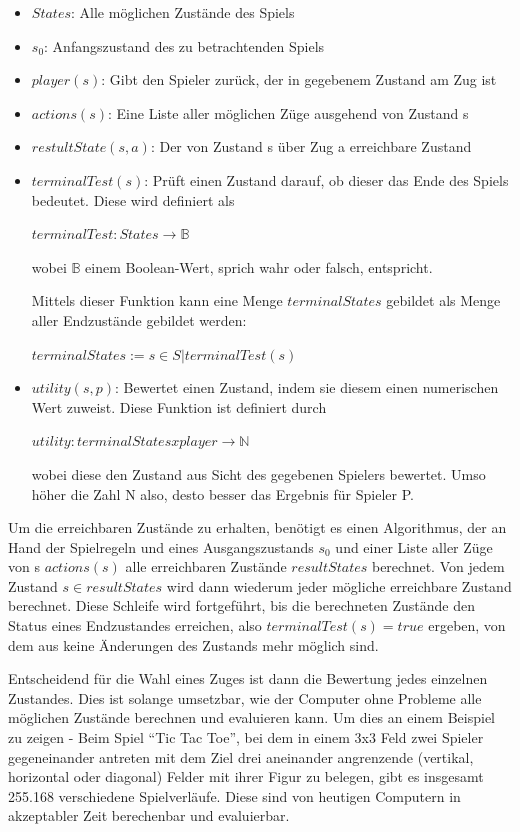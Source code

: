 \begin{itemize}
\item \textbf{$States$}: Alle möglichen Zustände des Spiels
\item \textbf{$s_0$}: Anfangszustand des zu betrachtenden Spiels
\item \textbf{$player(s)$}: Gibt den Spieler zurück, der in gegebenem Zustand am Zug ist
\item \textbf{$actions(s)$}: Eine Liste aller möglichen Züge ausgehend von Zustand s
\item \textbf{$restultState(s,a)$}: Der von Zustand s über Zug a erreichbare Zustand
\item \textbf{$terminalTest(s)$}:  Prüft einen Zustand darauf, ob dieser das Ende des Spiels bedeutet. Diese wird definiert als

$terminalTest : States \rightarrow \mathbb{B}$

wobei $\mathbb{B}$ einem Boolean-Wert, sprich wahr oder falsch, entspricht.

Mittels dieser Funktion kann eine Menge $terminalStates$ gebildet als Menge aller Endzustände gebildet werden:

$terminalStates := {s \in S | terminalTest(s)}$
\item \textbf{$utility(s, p)$}: Bewertet einen Zustand, indem sie diesem einen numerischen Wert zuweist. Diese Funktion ist definiert durch

$utility : terminalStates x player \rightarrow \mathbb{N}$

wobei diese den Zustand aus Sicht des gegebenen Spielers bewertet. Umso höher die Zahl N also, desto besser das Ergebnis für Spieler P.
\end{itemize}

Um die erreichbaren Zustände zu erhalten, benötigt es einen Algorithmus, der an Hand der Spielregeln und eines Ausgangszustands $s_0$ und einer Liste aller Züge von s $actions(s)$ alle erreichbaren Zustände $resultStates$ berechnet. Von jedem Zustand $s \in resultStates$ wird dann wiederum jeder mögliche erreichbare Zustand berechnet. Diese Schleife wird fortgeführt, bis die berechneten Zustände den Status eines Endzustandes erreichen, also $terminalTest(s) = true$ ergeben, von dem aus keine Änderungen des Zustands mehr möglich sind.

Entscheidend für die Wahl eines Zuges ist dann die Bewertung jedes einzelnen Zustandes. Dies ist solange umsetzbar, wie der Computer ohne Probleme alle möglichen Zustände berechnen und evaluieren kann. Um dies an einem Beispiel zu zeigen - Beim Spiel ``Tic Tac Toe'', bei dem in einem 3x3 Feld zwei Spieler gegeneinander antreten mit dem Ziel drei aneinander angrenzende (vertikal, horizontal oder diagonal) Felder mit ihrer Figur zu belegen, gibt es insgesamt 255.168 verschiedene Spielverläufe. Diese sind von heutigen Computern in akzeptabler Zeit berechenbar und evaluierbar.

